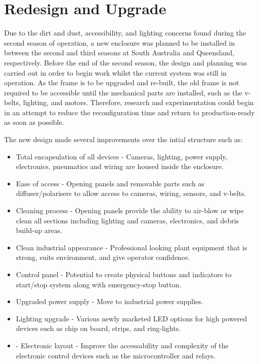 \documentclass[fleqn,twoside]{article}
\begin{document}
\section{Redesign and Upgrade}
\label{sec:III}


Due to the dirt and dust, accessibility, and lighting concerns found during the second season of operation, a new enclosure was planned to be installed in between the second and third seasons at South Australia and Queensland, respectively. Before the end of the second season, the design and planning was carried out in order to begin work whilst the current system was still in operation. As the frame is to be upgraded and re-built, the old frame is not required to be accessible until the mechanical parts are installed, such as the v-belts, lighting, and motors. Therefore, research and experimentation could begin in an attempt to reduce the reconfiguration time and return to production-ready as soon as possible.

The new design made several improvements over the intial structure such as:

\begin{itemize}
	\item Total encapsulation of all devices - Cameras, lighting, power supply, electronics, pneumatics and wiring are housed inside the enclosure.
	\item Ease of access - Opening panels and removable parts such as diffuser/polarisers to allow access to cameras, wiring, sensors, and v-belts.
	\item Cleaning process - Opening panels provide the ability to air-blow or wipe clean all sections including lighting and cameras, electronics, and debris build-up areas.
	\item Clean industrial appearance - Professional looking plant equipment that is strong, suits environment, and give operator confidence.
	\item Control panel - Potential to create physical buttons and indicators to start/stop system along with emergency-stop button.
	\item Upgraded power supply - Move to industrial power supplies.
	\item Lighting upgrade - Various newly marketed LED options for high powered devices such as chip on board, strips, and ring-lights.
	\item - Electronic layout - Improve the accessability and complexity of the electronic control devices such as the microcontroller and relays.
\end{itemize}
  
\end{document}
